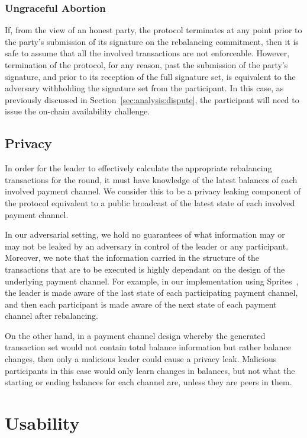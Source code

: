 \documentclass[sigconf]{acmart}
\begin{document}
\subsubsection{Ungraceful Abortion}
If, from the view of an honest party, the protocol terminates at any point prior to the party's submission of its signature on the rebalancing commitment, then it is safe to assume that all the involved transactions are not enforceable.
However, termination of the protocol, for any reason, past the submission of the party's signature, and prior to its reception of the full signature set, is equivalent to the adversary withholding the signature set from the participant. In this case, as previously discussed in Section~\ref{sec:analysis:dispute}, the participant will need to issue the on-chain availability challenge.

\subsection{Privacy}

In order for the leader to effectively calculate the appropriate rebalancing transactions for the round, it must have knowledge of the latest balances of each involved payment channel. We consider this to be a privacy leaking component of the protocol equivalent to a public broadcast of the latest state of each involved payment channel.

In our adversarial setting, we hold no guarantees of what information may or may not be leaked by an adversary in control of the leader or any participant. Moreover, we note that the information carried in the structure of the transactions that are to be executed is highly dependant on the design of the underlying payment channel. For example, in our implementation using Sprites~\cite{sprites}, the leader is made aware of the last state of each participating payment channel, and then each participant is made aware of the next state of each payment channel after rebalancing.

On the other hand, in a payment channel design whereby the generated transaction set would not contain total balance information but rather balance changes, then only a malicious leader could cause a privacy leak. Malicious participants in this case would only learn changes in balances, but not what the starting or ending balances for each channel are, unless they are peers in them.

\section{Usability}
\label{sec:usability}
\end{document}
